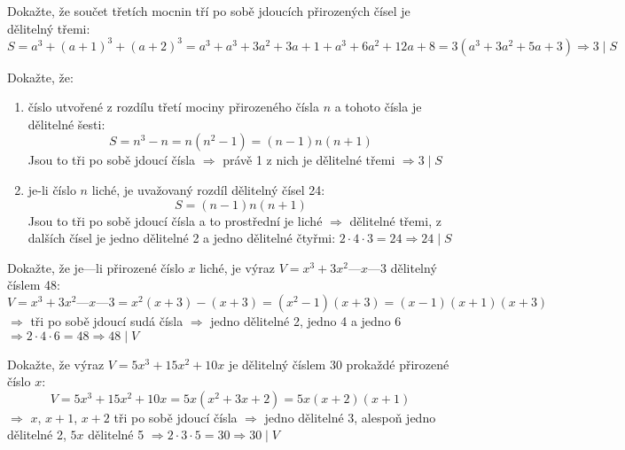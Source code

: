 \begin{example}[SÚM 145/305]
  Dokažte, že součet třetích mocnin tří po sobě jdoucích přirozených čísel je dělitelný třemi: $$S = a^3 + (a+1)^3 + (a+2)^3 = a^3 + a^3 + 3a^2 + 3a + 1 + a^3 + 6a^2 + 12a + 8 = 3(a^3 + 3a^2 + 5a + 3) \Rightarrow 3 \mid S $$
\end{example}

\begin{example}[SÚM 145/306]
  Dokažte, že:
  \begin{enumerate}[a]
    \item číslo utvořené z rozdílu třetí mociny přirozeného čísla $n$ a tohoto čísla je dělitelné šesti: $$S = n^3 - n = n(n^2-1) = (n-1)n(n+1)$$ Jsou to tři po sobě jdoucí čísla $\Rightarrow$ právě 1 z nich je dělitelné třemi $\Rightarrow 3 \mid S$
    \item je-li číslo $n$ liché, je uvažovaný rozdíl dělitelný čísel 24: $$S = (n-1)n(n+1)$$ Jsou to tři po sobě jdoucí čísla a to prostřední je liché $\Rightarrow$ dělitelné třemi, z dalších čísel je jedno dělitelné 2 a jedno dělitelné čtyřmi: $2\cdot4\cdot3 = 24 \Rightarrow 24 \mid S$
  \end{enumerate}
\end{example}

\begin{example}[SÚM 145/307]
  Dokažte, že je—li přirozené číslo $x$ liché, je výraz $V = x^3 + 3x^2 — x — 3$ dělitelný číslem 48: $$V = x^3 + 3x^2 — x — 3 = x^2(x+3) -(x+3) = (x^2 - 1)(x+3) = (x-1)(x+1)(x+3)$$ $\Rightarrow$ tři po sobě jdoucí sudá čísla $\Rightarrow$ jedno dělitelné 2, jedno 4 a jedno 6 $\Rightarrow 2\cdot4\cdot6 = 48 \Rightarrow 48 \mid V$
\end{example}

\begin{example}[SÚM 145/308]
  Dokažte, že výraz $V = 5x^3 + 15x^2 + 10x$ je dělitelný číslem 30 prokaždé přirozené číslo $x$: $$V = 5x^3 + 15x^2 + 10x = 5x(x^2 + 3x + 2) = 5x(x+2)(x+1)$$ $\Rightarrow$ $x$, $x+1$, $x+2$ tři po sobě jdoucí čísla $\Rightarrow$ jedno dělitelné 3, alespoň jedno dělitelné 2, $5x$ dělitelné 5 $\Rightarrow 2\cdot3\cdot5=30 \Rightarrow 30 \mid V$
\end{example}

